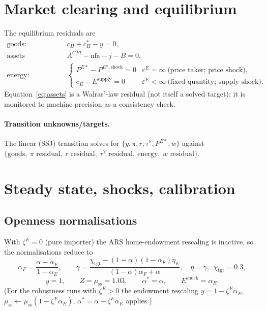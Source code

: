 \documentclass[11pt]{article}
\newcommand{\stst}{\mathrm{ss}}
\begin{document}
\section{Market clearing and equilibrium}\label{sec:clearing}

The equilibrium residuals are
\begin{align}
\text{goods:}&\quad c_H+c_H^{*}-y=0, \label{eq:goods}\\
\text{assets (Walras):}&\quad A^{CPI}-\mathrm{nfa}-j-B=0, \label{eq:assets}\\
\text{energy:}&\quad
\begin{cases}
P^{E*}-P^{E*,\text{shock}}=0 & \varepsilon^{E}=\infty\ \text{(price taker; price shock)},\\
c_E-E^{\text{supply}}=0 & \varepsilon^{E}<\infty\ \text{(fixed quantity; supply shock).}
\end{cases}\label{eq:energy}
\end{align}
Equation~\eqref{eq:assets} is a Walras'-law residual (not itself a solved
target); it is monitored to machine precision as a consistency check.

\paragraph{Transition unknowns/targets.} The linear (SSJ) transition solves for
$\{y,\pi,r,\tau^{Y},P^{E*},w\}$ against
$\{\text{goods},\ \pi\text{ residual},\ r\text{ residual},\ \tau^{Y}\text{ residual},
\ \text{energy},\ w\text{ residual}\}$.

\section{Steady state, shocks, calibration}\label{sec:ss}

\subsection{Openness normalisations}

With $\zeta^{E}=0$ (pure importer) the ARS home-endowment rescaling is inactive,
so the normalisations reduce to
\begin{equation}
\alpha_F=\frac{\alpha-\alpha_E}{1-\alpha_E},\qquad
\gamma=\frac{\chi_{\text{tgt}}-(1-\alpha)(1-\alpha_F)\eta_E}{(1-\alpha)\alpha_F+\alpha},\quad \eta=\gamma,\ \ \chi_{\text{tgt}}=0.3,
\end{equation}
\begin{equation}
y=1,\qquad Z=\mu_{\stst}=1.03,\qquad \alpha^{*}=\alpha,\qquad E^{\text{shock}}=\alpha_E .
\end{equation}
(For the robustness runs with $\zeta^{E}>0$ the endowment rescaling
$y=1-\zeta^{E}\alpha_E$, $\mu_{\stst}\leftarrow\mu_{\stst}(1-\zeta^{E}\alpha_E)$,
$\alpha^{*}=\alpha-\zeta^{E}\alpha_E$ applies.)
\end{document}
